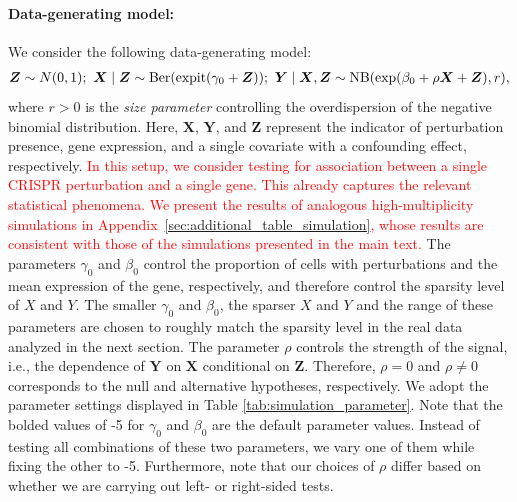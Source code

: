 \documentclass[12pt]{article}
\theoremstyle{definition}
\newcommand{\E}{\mathbb E}								%
\newcommand{\V}{\mathrm{Var}}							%
\newcommand{\expit}{\mathrm{expit}}                 	%
\newcommand{\prx}{\bm X}								%
\newcommand{\srx}{X}									%
\newcommand{\prz}{\bm Z}								%
\newcommand{\pry}{{\bm Y}}								%
\newcommand{\sry}{Y}									%
\begin{document}
\paragraph{Data-generating model:}
We consider the following data-generating model:
\small
\begin{align}\label{eq:simulation-model}
  \bm Z\sim N(0,1); \	\bm X \mid \bm Z\sim \textnormal{Ber}(\expit(\gamma_0+\bm Z));\ \bm Y \mid \bm X,\bm Z\sim \textnormal{NB}(\exp(\beta_0+\rho\bm X+\bm Z),r),
\end{align}
\normalsize
where $r > 0$ is the \textit{size parameter} controlling the overdispersion of the negative binomial distribution. Here, $\prx$, $\pry$, and $\prz$ represent the indicator of perturbation presence, gene expression, and a single covariate with a confounding effect, respectively. \textcolor{red}{In this setup, we consider testing for association between a single CRISPR perturbation and a single gene. This already captures the relevant statistical phenomena. We present the results of analogous high-multiplicity simulations in Appendix~\ref{sec:additional_table_simulation}, whose results are consistent with those of the simulations presented in the main text.} The parameters $\gamma_0$ and $\beta_0$ control the proportion of cells with perturbations and the mean expression of the gene, respectively, and therefore control the sparsity level of $\srx$ and $\sry$. The smaller $\gamma_0$ and $\beta_0$, the sparser $\srx$ and $\sry$ {\color{red} and the range of these parameters are chosen to roughly match the sparsity level in the real data analyzed in the next section.} The parameter $\rho$ controls the strength of the signal, i.e., the dependence of $\pry$ on $\prx$ conditional on $\prz$. Therefore, $\rho = 0$ and $\rho \neq 0$ corresponds to the null and alternative hypotheses, respectively. 
We adopt the parameter settings displayed in Table \ref{tab:simulation_parameter}. Note that the bolded values of -5 for $\gamma_0$ and $\beta_0$ are the default parameter values. Instead of testing all combinations of these two parameters, we vary one of them while fixing the other to -5. Furthermore, note that our choices of $\rho$ differ based on whether we are carrying out left- or right-sided tests.
\end{document}
